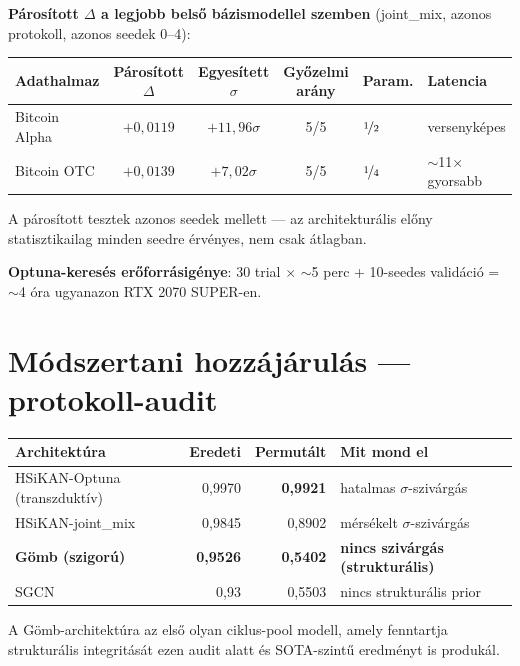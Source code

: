\documentclass[11pt,a4paper]{article}
\newcommand{\sig}{\ensuremath{\sigma}}
\begin{document}
\textbf{P\'aros\'itott $\Delta$ a legjobb bels\H{o} b\'azismodellel
szemben} (joint\_mix, azonos protokoll, azonos seedek 0--4):

\begin{center}
\begin{tabular}{lcccll}
\toprule
\textbf{Adathalmaz} & \textbf{P\'aros\'itott $\Delta$} & \textbf{Egyes\'itett $\sig$} & \textbf{Gy\H{o}zelmi ar\'any} & \textbf{Param.} & \textbf{Latencia} \\
\midrule
Bitcoin Alpha & $+0{,}0119$ & $+11{,}96\sig$ & 5/5 & $\nicefrac{1}{2}$ & versenyk\'epes \\
Bitcoin OTC   & $+0{,}0139$ & $+7{,}02\sig$  & 5/5 & $\nicefrac{1}{4}$ & $\sim$11$\times$ gyorsabb \\
\bottomrule
\end{tabular}
\end{center}

A p\'aros\'itott tesztek azonos seedek mellett — az architektur\'alis
el\H{o}ny statisztikailag minden seedre \'erv\'enyes, nem csak
\'atlagban.

\textbf{Optuna-keres\'es er\H{o}forr\'asig\'enye}: 30 trial
$\times$ $\sim$5 perc + 10-seedes valid\'aci\'o = $\sim$4 \'ora
ugyanazon RTX 2070 SUPER-en.

\section{M\'odszertani hozz\'aj\'arul\'as — protokoll-audit}

\begin{center}
\begin{tabular}{lrrl}
\toprule
\textbf{Architekt\'ura} & \textbf{Eredeti} & \textbf{Permut\'alt} & \textbf{Mit mond el} \\
\midrule
HSiKAN-Optuna (transzdukt\'iv)  & 0,9970 & \textbf{0,9921} & hatalmas \sig-sziv\'arg\'as \\
HSiKAN-joint\_mix               & 0,9845 & 0,8902 & m\'ers\'ekelt \sig-sziv\'arg\'as \\
\textbf{G\"omb (szigor\'u)}     & \textbf{0,9526} & \textbf{0,5402} & \textbf{nincs sziv\'arg\'as (struktur\'alis)} \\
SGCN                            & 0,93   & 0,5503 & nincs struktur\'alis prior \\
\bottomrule
\end{tabular}
\end{center}

A G\"omb-architekt\'ura az els\H{o} olyan ciklus-pool modell, amely
fenntartja struktur\'alis integrit\'as\'at ezen audit alatt \'es
SOTA-szint\H{u} eredm\'enyt is produk\'al.
\end{document}
